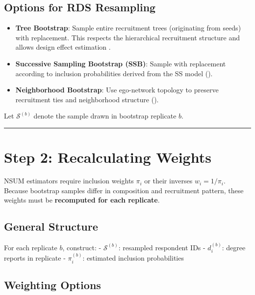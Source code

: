 \documentclass[
  12pt,
  letterpaper,
  DIV=11,
  numbers=noendperiod]{scrartcl}
\providecommand{\tightlist}{%
  \setlength{\itemsep}{0pt}\setlength{\parskip}{0pt}}
\theoremstyle{plain}
\theoremstyle{definition}
\begin{document}
\subsection{Options for RDS
Resampling}\label{options-for-rds-resampling}

\begin{itemize}
\tightlist
\item
  \textbf{Tree Bootstrap}: Sample entire recruitment trees (originating
  from seeds) with replacement. This respects the hierarchical
  recruitment structure and allows design effect estimation
  \autocite{salg06-variance}.
\item
  \textbf{Successive Sampling Bootstrap (SSB)}: Sample with replacement
  according to inclusion probabilities derived from the SS model
  (\textcite{gile11-improv}).
\item
  \textbf{Neighborhood Bootstrap}: Use ego-network topology to preserve
  recruitment ties and neighborhood structure
  (\textcite{yauc22-neighboor}).
\end{itemize}

Let \(\mathcal{S}^{(b)}\) denote the sample drawn in bootstrap replicate
\(b\).

\begin{center}\rule{0.5\linewidth}{0.5pt}\end{center}

\section{Step 2: Recalculating
Weights}\label{step-2-recalculating-weights}

NSUM estimators require inclusion weights \(\pi_i\) or their inverses
\(w_i = 1 / \pi_i\). Because bootstrap samples differ in composition and
recruitment pattern, these weights must be \textbf{recomputed for each
replicate}.

\subsection{General Structure}\label{general-structure}

For each replicate \(b\), construct: - \(\mathcal{S}^{(b)}\): resampled
respondent IDs - \(d_i^{(b)}\): degree reports in replicate -
\(\pi_i^{(b)}\): estimated inclusion probabilities

\subsection{Weighting Options}\label{weighting-options}
\end{document}
